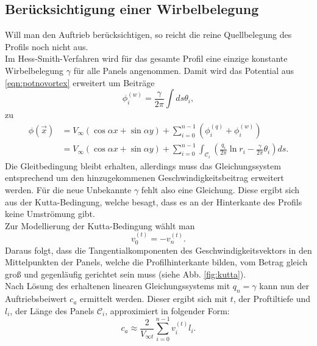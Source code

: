 \subsection{Berücksichtigung einer Wirbelbelegung}
Will man den Auftrieb berücksichtigen, so reicht die reine Quellbelegung des Profils noch nicht aus. \\
Im Hess-Smith-Verfahren wird für das gesamte Profil eine einzige konstante Wirbelbelegung $\gamma$ für alle Panels angenommen. Damit wird das Potential aus \eqref{eqn:potnovortex} erweitert um Beiträge
\begin{equation}
\phi_i^{(w)} =  \frac{\gamma}{2 \pi } \int ds \theta_i,
\end{equation}
zu
\begin{align}
\phi(\vec x) &=  V_{\infty} (\cos \alpha x + \sin \alpha y) + \sum_{i=0}^{n-1} \left( \phi_i^{(q)} + \phi_i^{(w)} \right) \nonumber \\
&= V_{\infty} (\cos \alpha x + \sin \alpha y) + \sum_{i=0}^{n-1} \int_{\mathcal{C}_i} \left( \frac{q_i}{2\pi } \ln r_i - \frac{\gamma}{2\pi } \theta_{i} \right) ds.
\end{align}
Die Gleitbedingung bleibt erhalten, allerdings muss das Gleichungssystem entsprechend um den hinzugekommenen Geschwindigkeitsbeitrag erweitert werden. Für die neue Unbekannte $\gamma$ fehlt also eine Gleichung. Diese ergibt sich aus der Kutta-Bedingung, welche besagt, dass es an der Hinterkante des Profils keine Umströmung gibt.\\
Zur Modellierung der Kutta-Bedingung wählt man
\begin{equation}
v_0^{(t)} =  -v_n^{(t)}.
\end{equation} 
Daraus folgt, dass die Tangentialkomponenten des Geschwindigkeitsvektors in den Mittelpunkten der Panels, welche die Profilhinterkante bilden, vom Betrag gleich groß und gegenläufig gerichtet sein muss (siehe Abb. \ref{fig:kutta}). \\
Nach Lösung des erhaltenen linearen Gleichungssystems mit $q_n = \gamma$ kann nun der Auftriebsbeiwert $c_a$ ermittelt werden. Dieser ergibt sich mit $t$, der Proftiltiefe und $l_i$, der Länge des Panels $\mathcal{C}_i$, approximiert in folgender Form:
\begin{equation}
c_a \approx \frac{2}{V_{\infty t}}\sum_{i=0}^{n-1} v_i^{(t)} l_i.
\end{equation}
